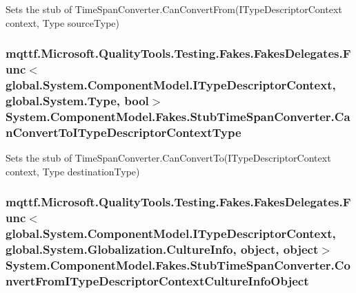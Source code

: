 Sets the stub of Time\-Span\-Converter.\-Can\-Convert\-From(\-I\-Type\-Descriptor\-Context context, Type source\-Type)

\hypertarget{class_system_1_1_component_model_1_1_fakes_1_1_stub_time_span_converter_a77249b036dd3ddbfcef7256a381d89d5}{
\subsubsection[{Can\-Convert\-To\-I\-Type\-Descriptor\-Context\-Type}]{\setlength{\rightskip}{0pt plus 5cm}mqttf.\-Microsoft.\-Quality\-Tools.\-Testing.\-Fakes.\-Fakes\-Delegates.\-Func$<$global.\-System.\-Component\-Model.\-I\-Type\-Descriptor\-Context, global.\-System.\-Type, bool$>$ System.\-Component\-Model.\-Fakes.\-Stub\-Time\-Span\-Converter.\-Can\-Convert\-To\-I\-Type\-Descriptor\-Context\-Type}}\label{class_system_1_1_component_model_1_1_fakes_1_1_stub_time_span_converter_a77249b036dd3ddbfcef7256a381d89d5}


Sets the stub of Time\-Span\-Converter.\-Can\-Convert\-To(\-I\-Type\-Descriptor\-Context context, Type destination\-Type)

\hypertarget{class_system_1_1_component_model_1_1_fakes_1_1_stub_time_span_converter_af83a5a266dda94be5eb133fa83d387bd}{
\subsubsection[{Convert\-From\-I\-Type\-Descriptor\-Context\-Culture\-Info\-Object}]{\setlength{\rightskip}{0pt plus 5cm}mqttf.\-Microsoft.\-Quality\-Tools.\-Testing.\-Fakes.\-Fakes\-Delegates.\-Func$<$global.\-System.\-Component\-Model.\-I\-Type\-Descriptor\-Context, global.\-System.\-Globalization.\-Culture\-Info, object, object$>$ System.\-Component\-Model.\-Fakes.\-Stub\-Time\-Span\-Converter.\-Convert\-From\-I\-Type\-Descriptor\-Context\-Culture\-Info\-Object}}\label{class_system_1_1_component_model_1_1_fakes_1_1_stub_time_span_converter_af83a5a266dda94be5eb133fa83d387bd}


